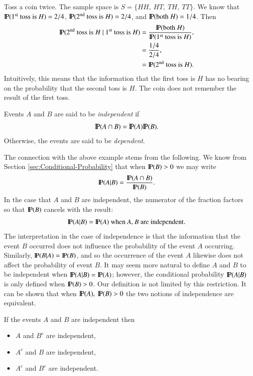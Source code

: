 \documentclass[captions=tableheading]{scrbook}
\begin{document}
Toss a coin twice. The sample space is \(S= \{ HH,\ HT,\ TH,\ TT \} \). We know that \(\P(1^{\mathrm{st}}\mbox{ toss is }H)=2/4\), \(\P(2^{\mathrm{nd}}\mbox{ toss is }H)=2/4\), and \(\P(\mbox{both }H)=1/4\). Then
\begin{align*} \P(2^{\mathrm{nd}}\mbox{ toss is }H\ |\ 1^{\mathrm{st}}\mbox{ toss is }H) & =\frac{\P(\mbox{both }H)}{\P(1^{\mathrm{st}}\mbox{ toss is }H)},\\
 & =\frac{1/4}{2/4},\\
 & =\P(2^{\mathrm{nd}}\mbox{ toss is }H).
\end{align*}
Intuitively, this means that the information that the first toss is \(H\) has no bearing on the probability that the second toss is \(H\). The coin does not remember the result of the first toss. 

\begin{defn}
Events \(A\) and \(B\) are said to be \emph{independent} if 
\begin{equation}
\P(A\cap B)=\P(A)\P(B).
\end{equation}
Otherwise, the events are said to be \emph{dependent}. 
\end{defn}

The connection with the above example stems from the following. We know from Section \ref{sec:Conditional-Probability} that when \(\P(B)>0\) we may write
\begin{equation}
\P(A|B)=\frac{\P(A\cap B)}{\P(B)}.
\end{equation}
In the case that \(A\) and \(B\) are independent, the numerator of the fraction factors so that \(\P(B)\) cancels with the result:
\begin{equation}
\P(A|B)=\P(A)\mbox{ when \mbox{\emph{A},\emph{ B}} are independent.}
\end{equation}
The interpretation in the case of independence is that the information that the event \(B\) occurred does not influence the probability of the event \(A\) occurring. Similarly, \(\P(B|A)=\P(B)\), and so the occurrence of the event \(A\) likewise does not affect the probability of event \(B\). It may seem more natural to define \(A\) and \(B\) to be independent when \(\P(A|B)=\P(A)\); however, the conditional probability \(\P(A|B)\) is only defined when \(\P(B)>0\). Our definition is not limited by this restriction. It can be shown that when \(\P(A),\ \P(B)>0\) the two notions of independence are equivalent.

\begin{prop}
If the events \(A\) and \(B\) are independent then
\begin{itemize}
\item \(A\) and \(B^{c}\) are independent,
\item \(A^{c}\) and \(B\) are independent,
\item \(A^{c}\) and \(B^{c}\) are independent.
\end{itemize}
\end{prop}
\end{document}

